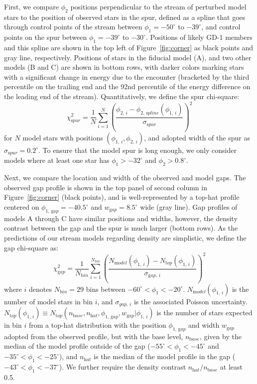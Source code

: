 \documentclass[twocolumn]{aastex62}
\begin{document}
First, we compare $\phi_2$ positions perpendicular to the stream of perturbed model stars to the position of observed stars in the spur, defined as a spline that goes through control points of the stream between $\phi_1=-50^\circ$ to $-39^\circ$, and control points on the spur between $\phi_1=-39^\circ$ to $-30^\circ$.
Positions of likely GD-1 members and this spline are shown in the top left of Figure~\ref{fig:corner} as black points and gray line, respectively.
Positions of stars in the fiducial model (A), and two other models (B and C) are shown in bottom rows, with darker colors marking stars with a significant change in energy due to the encounter (bracketed by the third percentile on the trailing end and the 92nd percentile of the energy difference on the leading end of the stream). 
Quantitatively, we define the spur chi-square:
\begin{equation}
\chi^2_{\mathrm spur} = \frac{1}{N}\sum_{i=1}^{N} \left(\frac{\phi_{2,\,i} - \phi_{2,\,\mathrm spline}(\phi_{1,\,i})}{\sigma_{\mathrm spur}}\right)^2 
\end{equation}
for $N$ model stars with positions $(\phi_{1,\,i}, \phi_{2,\,i})$, and adopted width of the spur as $\sigma_{\mathrm spur} = 0.2^\circ$.
To ensure that the model spur is long enough, we only consider models where at least one star has $\phi_1>-32^\circ$ and $\phi_2>0.8^\circ$.

Next, we compare the location and width of the observed and model gaps.
The observed gap profile is shown in the top panel of second column in Figure~\ref{fig:corner} (black points), and is well-represented by a top-hat profile centered on $\phi_{1,\,\mathrm gap}=-40.5^\circ$ and $w_{\mathrm gap}=8.5^\circ$ wide (gray line).
Gap profiles of models A through C have similar positions and widths, however, the density contrast between the gap and the spur is much larger (bottom rows).
As the predictions of our stream models regarding density are simplistic, we define the gap chi-square as:
\begin{equation}
\chi^2_{\mathrm gap} = \frac{1}{N_{\mathrm bin}}\sum_{i=1}^{N_{\mathrm bin}} \left(\frac{N_{\mathrm model}(\phi_{1,\,i}) - N_{\mathrm top}(\phi_{1,\,i})}{\sigma_{\mathrm gap,\,i}}\right)^2
\end{equation}
where $i$ denotes $N_{\mathrm bin}=29$ bins between $-60^\circ<\phi_1<-20^\circ$.
$N_{\mathrm model}(\phi_{1,\,i})$ is the number of model stars in bin $i$, and $\sigma_{gap,\,i}$ is the associated Poisson uncertainty.
$N_{\mathrm top}(\phi_{1,\,i})\equiv N_{\mathrm top}(n_{\mathrm base}, n_{\mathrm hat}, \phi_{1,\,\mathrm gap}, w_{\mathrm gap} | \phi_{1,\,i})$ is the number of stars expected in bin $i$ from a top-hat distribution with the position $\phi_{1,\,\mathrm gap}$ and width $w_{\mathrm gap}$ adopted from the observed profile, but with the base level, $n_{\mathrm base}$, given by the median of the model profile outside of the gap ($-55^\circ<\phi_1<-45^\circ$ and $-35^\circ<\phi_1<-25^\circ$), and $n_{\mathrm hat}$ is the median of the model profile in the gap ($-43^\circ<\phi_1<-37^\circ$).
We further require the density contrast $n_{\mathrm hat} / n_{\mathrm base}$ at least 0.5.
\end{document}

